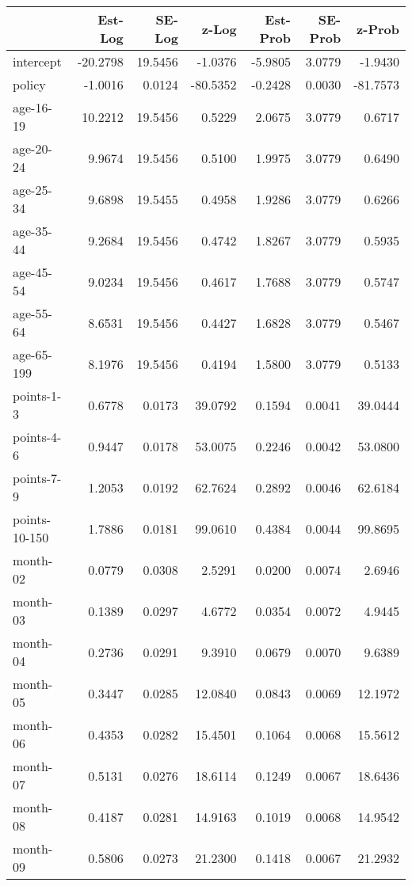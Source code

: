 \documentclass[10pt]{article}
\begin{document}
\begin{table}[ht]
\centering
\begin{tabular}{lrrrrrr}
  \hline
 & Est-Log & SE-Log & z-Log & Est-Prob & SE-Prob & z-Prob \\ 
  \hline
intercept & -20.2798 & 19.5456 & -1.0376 & -5.9805 & 3.0779 & -1.9430 \\ 
  policy & -1.0016 & 0.0124 & -80.5352 & -0.2428 & 0.0030 & -81.7573 \\ 
  age-16-19 & 10.2212 & 19.5456 & 0.5229 & 2.0675 & 3.0779 & 0.6717 \\ 
  age-20-24 & 9.9674 & 19.5456 & 0.5100 & 1.9975 & 3.0779 & 0.6490 \\ 
  age-25-34 & 9.6898 & 19.5455 & 0.4958 & 1.9286 & 3.0779 & 0.6266 \\ 
  age-35-44 & 9.2684 & 19.5456 & 0.4742 & 1.8267 & 3.0779 & 0.5935 \\ 
  age-45-54 & 9.0234 & 19.5456 & 0.4617 & 1.7688 & 3.0779 & 0.5747 \\ 
  age-55-64 & 8.6531 & 19.5456 & 0.4427 & 1.6828 & 3.0779 & 0.5467 \\ 
  age-65-199 & 8.1976 & 19.5456 & 0.4194 & 1.5800 & 3.0779 & 0.5133 \\ 
  points-1-3 & 0.6778 & 0.0173 & 39.0792 & 0.1594 & 0.0041 & 39.0444 \\ 
  points-4-6 & 0.9447 & 0.0178 & 53.0075 & 0.2246 & 0.0042 & 53.0800 \\ 
  points-7-9 & 1.2053 & 0.0192 & 62.7624 & 0.2892 & 0.0046 & 62.6184 \\ 
  points-10-150 & 1.7886 & 0.0181 & 99.0610 & 0.4384 & 0.0044 & 99.8695 \\ 
  month-02 & 0.0779 & 0.0308 & 2.5291 & 0.0200 & 0.0074 & 2.6946 \\ 
  month-03 & 0.1389 & 0.0297 & 4.6772 & 0.0354 & 0.0072 & 4.9445 \\ 
  month-04 & 0.2736 & 0.0291 & 9.3910 & 0.0679 & 0.0070 & 9.6389 \\ 
  month-05 & 0.3447 & 0.0285 & 12.0840 & 0.0843 & 0.0069 & 12.1972 \\ 
  month-06 & 0.4353 & 0.0282 & 15.4501 & 0.1064 & 0.0068 & 15.5612 \\ 
  month-07 & 0.5131 & 0.0276 & 18.6114 & 0.1249 & 0.0067 & 18.6436 \\ 
  month-08 & 0.4187 & 0.0281 & 14.9163 & 0.1019 & 0.0068 & 14.9542 \\ 
  month-09 & 0.5806 & 0.0273 & 21.2300 & 0.1418 & 0.0067 & 21.2932 \\ 

\end{tabular}
\end{table}
\end{document}
